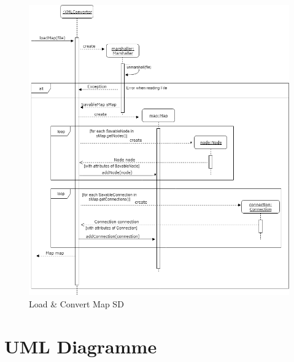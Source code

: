 \begin{figure}[H]
	\centering
		\includegraphics[scale=0.6]{images/loadConvertSD.png}
	\caption{Load \& Convert Map SD}
	\label{fig:loadConvert_SD}
\end{figure}

\section{UML Diagramme}
\label{sec:uml_diagramme}
